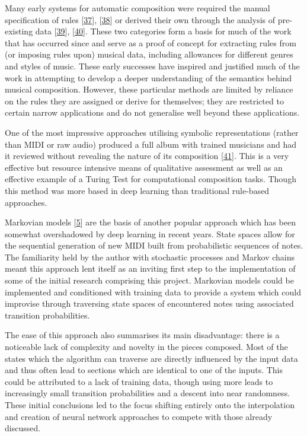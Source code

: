 \documentclass[12pt,]{article}
\begin{document}
Many early systems for automatic composition were required the manual
specification of rules
{[}\protect\hyperlink{ref-ebciouglu1988expert}{37}{]},
{[}\protect\hyperlink{ref-cruz1998learning}{38}{]} or derived their own
through the analysis of pre-existing data
{[}\protect\hyperlink{ref-cope1996experiments}{39}{]},
{[}\protect\hyperlink{ref-spangler1998bach}{40}{]}. These two categories
form a basis for much of the work that has occurred since and serve as a
proof of concept for extracting rules from (or imposing rules upon)
musical data, including allowances for different genres and styles of
music. These early successes have inspired and justified much of the
work in attempting to develop a deeper understanding of the semantics
behind musical composition. However, these particular methods are
limited by reliance on the rules they are assigned or derive for
themselves; they are restricted to certain narrow applications and do
not generalise well beyond these applications.

One of the most impressive approaches utilising symbolic representations
(rather than MIDI or raw audio) produced a full album with trained
musicians and had it reviewed without revealing the nature of its
composition {[}\protect\hyperlink{ref-sturm2018let}{41}{]}. This is a
very effective but resource intensive means of qualitative assessment as
well as an effective example of a Turing Test for computational
composition tasks. Though this method was more based in deep learning
than traditional rule-based approaches.

Markovian models {[}\protect\hyperlink{ref-luque2009stochastic}{5}{]}
are the basis of another popular approach which has been somewhat
overshadowed by deep learning in recent years. State spaces allow for
the sequential generation of new MIDI built from probabilistic sequences
of notes. The familiarity held by the author with stochastic processes
and Markov chains meant this approach lent itself as an inviting first
step to the implementation of some of the initial research comprising
this project. Markovian models could be implemented and conditioned with
training data to provide a system which could improvise through
traversing state spaces of encountered notes using associated transition
probabilities.

The ease of this approach also summarises its main disadvantage: there
is a noticeable lack of complexity and novelty in the pieces composed.
Most of the states which the algorithm can traverse are directly
influenced by the input data and thus often lead to sections which are
identical to one of the inputs. This could be attributed to a lack of
training data, though using more leads to increasingly small transition
probabilities and a descent into near randomness. These initial
conclusions led to the focus shifting entirely onto the interpolation
and creation of neural network approaches to compete with those already
discussed.
\end{document}
